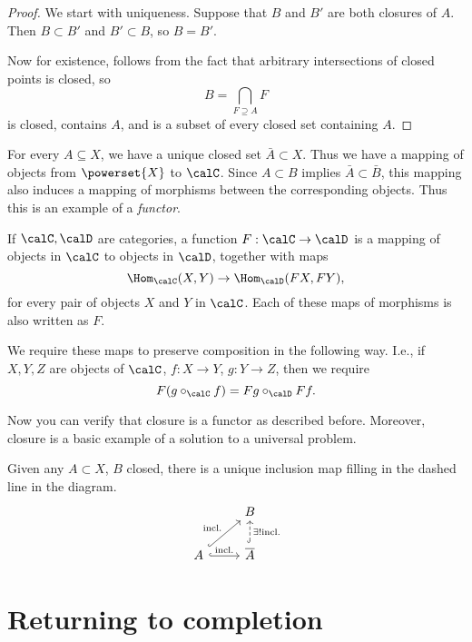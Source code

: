 \documentclass{article}
\begin{document}
\begin{proof}
    We start with uniqueness. Suppose that $B$ and $B'$ are 
    both closures of $A$. Then $B\subset B'$ and $B'\subset B$,
    so $B=B'$.

    Now for existence, follows from the fact that arbitrary
    intersections of closed points is closed, so 
    \[ B = \bigcap_{F\supseteq A} F \]
    is closed, contains $A$, and is a subset of every 
    closed set containing $A$.
\end{proof}

For every $A\subseteq X$, we have a unique closed set 
$\bar{A}\subset X$. Thus we have a mapping of objects 
from $\powerset{X}$ to $\calC$. Since $A\subset B$ implies 
$\bar{A}\subset \bar{B}$, this mapping also induces a mapping 
of morphisms between the corresponding objects.
Thus this is an example of a \emph{functor}.

\begin{definition}
    If $\calC,\calD$ are categories, a function $F:\calC\to\calD$
    is a mapping of objects in $\calC$ to objects in $\calD$,
    together with maps 
    \[\Hom_{\calC}(X,Y)\to \Hom_{\calD}(FX,FY),\]
    for every pair of objects $X$ and $Y$ in $\calC$.
    Each of these maps of morphisms is also written as $F$.

    We require these maps to preserve composition in the following 
    way.
    I.e., if $X,Y,Z$ are objects of $\calC$, $f:X\to Y$, $g:Y\to Z$,
    then we require \[ F(g\circ_\calC f) = Fg\circ_\calD Ff. \]
\end{definition}

Now you can verify that closure is a functor as described before.
Moreover, closure is a basic example of a solution to a 
universal problem.

Given any $A\subset X$, $B$ closed, there is a unique inclusion
map filling in the dashed line in the diagram.
\[
\begin{tikzcd}
                                                                   & B                                                             \\
A \arrow[ru, "\text{incl.}", hook] \arrow[r, "\text{incl.}", hook] & \overline{A} \arrow[u, "\exists!\text{incl.}"', dashed, hook]
\end{tikzcd}
\]

\section{Returning to completion}
\end{document}
